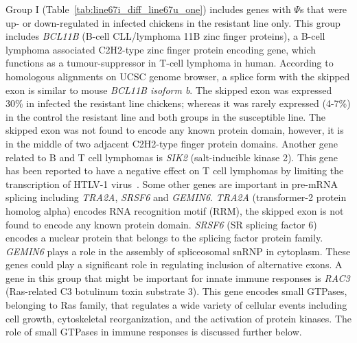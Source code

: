 \documentclass[10pt]{article}
\begin{document}
Group I (Table~\ref{tab:line67i_diff_line67u_one}) includes genes
with $\Psi$s that were up- or down-regulated in infected chickens
in the resistant line only.  This group includes {\em BCL11B}
(B-cell CLL/lymphoma 11B zinc finger proteins), a B-cell lymphoma
associated C2H2-type zinc finger protein encoding gene, which
functions as a tumour-suppressor in T-cell lymphoma in human.
According to homologous alignments on UCSC genome browser, a
splice form with the skipped exon is similar to mouse {\em BCL11B
isoform b}.  The skipped exon was expressed 30\% in infected the
resistant line chickens; whereas it was rarely expressed (4-7\%)
in the control the resistant line and both groups in the
susceptible line.  The skipped exon was not found to encode any
known protein domain, however, it is in the middle of two
adjacent C2H2-type finger protein domains.  Another gene related
to B and T cell lymphomas is {\em SIK2} (salt-inducible kinase
2).  This gene has been reported to have a negative effect on T
cell lymphomas by limiting the transcription of HTLV-1
virus~\cite{tang2013lkb1}.  Some other genes are important in
pre-mRNA splicing including {\em TRA2A}, {\em SRSF6} and {\em
GEMIN6}.  {\em TRA2A} (transformer-2 protein homolog alpha)
encodes RNA recognition motif (RRM), the skipped exon is not
found to encode any known protein domain.  {\em SRSF6} (SR
splicing factor 6) encodes a nuclear protein that belongs to the
splicing factor protein family.  {\em GEMIN6} plays a role in the
assembly of spliceosomal snRNP in cytoplasm.  These genes could
play a significant role in regulating inclusion of alternative
exons.  A gene in this group that might be important for innate
immune responses is {\em RAC3} (Ras-related C3 botulinum toxin
substrate 3).  This gene encodes small GTPases, belonging to Ras
family, that regulates a wide variety of cellular events
including cell growth, cytoskeletal reorganization, and the
activation of protein kinases.  The role of small GTPases in
immune responses is discussed further below.
\end{document}
